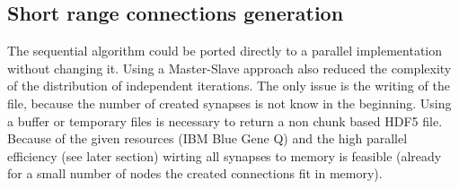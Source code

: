 \subsection{Short range connections generation}
The sequential algorithm could be ported directly to a parallel implementation without changing it.
Using a Master-Slave approach also reduced the complexity of the distribution of independent iterations.
The only issue is the writing of the file, because the number of created synapses is not know in the beginning.
Using a buffer or temporary files is necessary to return a non chunk based HDF5 file.
Because of the given resources (IBM Blue Gene Q) and the high parallel efficiency (see later section)
wirting all synapses to memory is feasible (already for a small number of nodes the created connections fit in memory).

